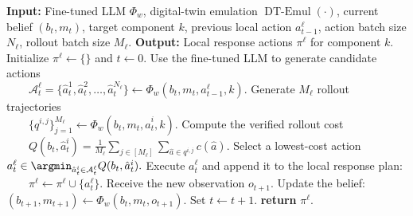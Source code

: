 \documentclass[sigconf]{acmart}
\begin{document}
\begin{algorithm}[h]
\caption{Operational-Scale Digital-Twin-Verified Planning}
\label{algo:mcts-plan}
    \begin{algorithmic}[1]
        \STATE \textbf{Input:} Fine-tuned LLM $\Phi_w$, digital-twin emulation $\operatorname{DT-Emul}(\cdot)$, current belief $(b_t,m_t)$, target component $k$, previous local action $a_{t-1}^{\ell}$, action batch size $N_{\ell}$, rollout batch size $M_{\ell}$.
        \STATE \textbf{Output:} Local response actions $\pi^{\ell}$ for component $k$.
        \STATE Initialize $\pi^{\ell}\leftarrow\{\}$ and $t\leftarrow 0$.
            \STATE Use the fine-tuned LLM to generate candidate actions\\
            $\quad\quad\mathcal{A}^{\ell}_t = \{\hat a_t^1,\hat a_t^2,\ldots,\hat a_t^{N_{\ell}}\} \gets \Phi_w(b_t,m_t,a_{t-1}^{\ell},k).$
                \STATE Generate $M_{\ell}$ rollout trajectories\\
                $\quad\quad\{q^{i,j}\}_{j=1}^{M_{\ell}}\gets \Phi_w(b_t,m_t,\hat a_t^i,k).$
                \STATE Compute the verified rollout cost\\
                $\quad\quad Q(b_t,\hat a_t^i)=\frac{1}{M_{\ell}}\sum_{j\in[M_{\ell}]}\sum_{\hat a\in q^{i,j}}c(\hat a).$
            \ENDFOR
            \STATE Select a lowest-cost action $a_t^{\ell} \in \argmin_{\hat a_t^i\in\mathcal{A}^{\ell}_t}Q(b_t,\hat a_t^i).$
            \STATE Execute $a_t^{\ell}$ and append it to the local response plan:\\
            $\quad\quad \pi^{\ell}\leftarrow \pi^{\ell}\cup\{a_t^{\ell}\}.$            
            \STATE Receive the new observation $o_{t+1}$.
            \STATE Update the belief: $(b_{t+1},m_{t+1}) \gets \Phi_w(b_t,m_t,o_{t+1}).$
            \STATE Set $t\leftarrow t+1$.
        \ENDWHILE
        \STATE \textbf{return} $\pi^{\ell}$.
    \end{algorithmic}
\end{algorithm}
\end{document}

